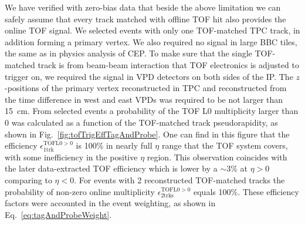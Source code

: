 We have verified with zero-bias data that beside the above limitation we can safely assume that every track matched with offline TOF hit also provides the online TOF signal. We selected events with only one TOF-matched TPC track, in addition forming a primary vertex. We also required no signal in large BBC tiles, the same as in physics analysis of CEP. To make sure that the single TOF-matched track is from beam-beam interaction that TOF electronics is adjusted to trigger on, we required the signal in VPD detectors on both sides of the IP. The $z$-positions of the primary vertex reconstructed in TPC and reconstructed from the time difference in west and east VPDs was required to be not larger than 15~cm. From selected events a probability of the TOF L0 multiplicity larger than 0 was calculated as a function of the TOF-matched track pseudorapidity, as shown in Fig.~\ref{fig:tofTrigEffTagAndProbe}. One can find in this figure that the efficiency $\epsilon^{\text{TOFL0}>0}_{1\text{trk}}$ is 100\% in nearly full $\eta$ range that the TOF system covers, with some inefficiency in the positive $\eta$ region. This observation coincides with the later data-extracted TOF efficiency which is lower by a $\sim3\%$ at $\eta>0$ comparing to $\eta<0$. For events with 2 reconstructed TOF-matched tracks the probability of non-zero online multiplicity $\epsilon^{\text{TOFL0}>0}_{2\text{trks}}$ equals 100\%. These efficiency factors were accounted in the event weighting, as shown in Eq.~\eqref{eq:tagAndProbeWeight}.

